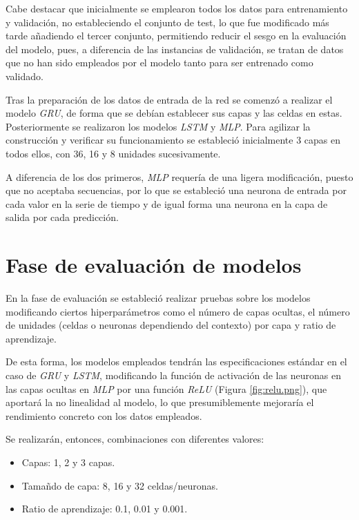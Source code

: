 
Cabe destacar que inicialmente se emplearon todos los datos para entrenamiento y validación, no estableciendo
el conjunto de test, lo que fue modificado más tarde añadiendo el tercer conjunto, permitiendo reducir el sesgo en 
la evaluación del modelo, pues, a diferencia de las instancias de validación, se tratan
de datos que no han sido empleados por el modelo tanto para ser entrenado como validado.

Tras la preparación de los datos de entrada de la red se comenzó a realizar el modelo \textit{GRU}, de forma
que se debían establecer sus capas y las celdas en estas. Posteriormente se realizaron los modelos
\textit{LSTM} y \textit{MLP}.
Para agilizar la construcción y verificar su funcionamiento se estableció inicialmente 3 capas en todos ellos, con
36, 16 y 8 unidades sucesivamente.

A diferencia de los dos primeros, \textit{MLP} requería de una ligera modificación, puesto que no aceptaba secuencias, 
por lo que se estableció una neurona de entrada por cada valor en la serie de tiempo y de igual forma una 
neurona en la capa de salida por cada predicción. 

\section{Fase de evaluación de modelos}
En la fase de evaluación se estableció realizar pruebas sobre los modelos modificando ciertos hiperparámetros como 
el número de capas ocultas, el número de unidades (celdas o neuronas dependiendo del contexto) por capa y
ratio de aprendizaje.

De esta forma, los modelos empleados tendrán las especificaciones estándar en el caso de
\textit{GRU} y \textit{LSTM}, modificando la función de activación de las neuronas en las capas ocultas en 
\textit{MLP} por una función \textit{ReLU} (Figura \ref{fig:relu.png}), que aportará la no linealidad al modelo, lo que presumiblemente
mejoraría el rendimiento concreto con los datos empleados.


Se realizarán, entonces, combinaciones con diferentes valores:
\begin{itemize}
    \item Capas: 1, 2 y 3 capas.
    \item Tamañdo de capa: 8, 16 y 32 celdas/neuronas.
    \item Ratio de aprendizaje: 0.1, 0.01 y 0.001.
\end{itemize}
